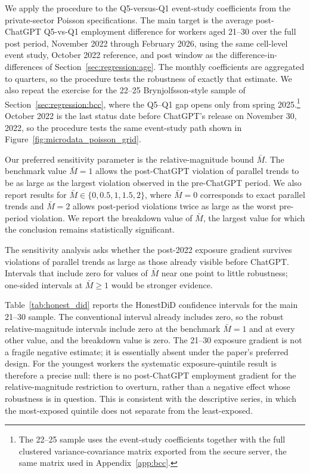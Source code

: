 \documentclass[12pt]{article}
\begin{document}
We apply the procedure to the Q5-versus-Q1 event-study coefficients from the private-sector Poisson specifications. The main target is the average post-ChatGPT Q5-vs-Q1 employment difference for workers aged 21--30 over the full post period, November 2022 through February 2026, using the same cell-level event study, October 2022 reference, and post window as the difference-in-differences of Section~\ref{sec:regression:age}. The monthly coefficients are aggregated to quarters, so the procedure tests the robustness of exactly that estimate. We also repeat the exercise for the 22--25 Brynjolfsson-style sample of Section~\ref{sec:regression:bcc}, where the Q5--Q1 gap opens only from spring 2025.\footnote{The 22--25 sample uses the event-study coefficients together with the full clustered variance-covariance matrix exported from the secure server, the same matrix used in Appendix~\ref{app:bcc}.} October 2022 is the last status date before ChatGPT's release on November 30, 2022, so the procedure tests the same event-study path shown in Figure~\ref{fig:microdata_poisson_grid}.

Our preferred sensitivity parameter is the relative-magnitude bound $\bar{M}$. The benchmark value $\bar{M}=1$ allows the post-ChatGPT violation of parallel trends to be as large as the largest violation observed in the pre-ChatGPT period. We also report results for $\bar{M}\in\{0,0.5,1,1.5,2\}$, where $\bar{M}=0$ corresponds to exact parallel trends and $\bar{M}=2$ allows post-period violations twice as large as the worst pre-period violation. We report the breakdown value of $\bar{M}$, the largest value for which the conclusion remains statistically significant.

The sensitivity analysis asks whether the post-2022 exposure gradient survives violations of parallel trends as large as those already visible before ChatGPT. Intervals that include zero for values of $\bar{M}$ near one point to little robustness; one-sided intervals at $\bar{M}\geq 1$ would be stronger evidence.

Table~\ref{tab:honest_did} reports the HonestDiD confidence intervals for the main 21--30 sample. The conventional interval already includes zero, so the robust relative-magnitude intervals include zero at the benchmark $\bar{M}=1$ and at every other value, and the breakdown value is zero. The 21--30 exposure gradient is not a fragile negative estimate; it is essentially absent under the paper's preferred design. For the youngest workers the systematic exposure-quintile result is therefore a precise null: there is no post-ChatGPT employment gradient for the relative-magnitude restriction to overturn, rather than a negative effect whose robustness is in question. This is consistent with the descriptive series, in which the most-exposed quintile does not separate from the least-exposed.
\end{document}
